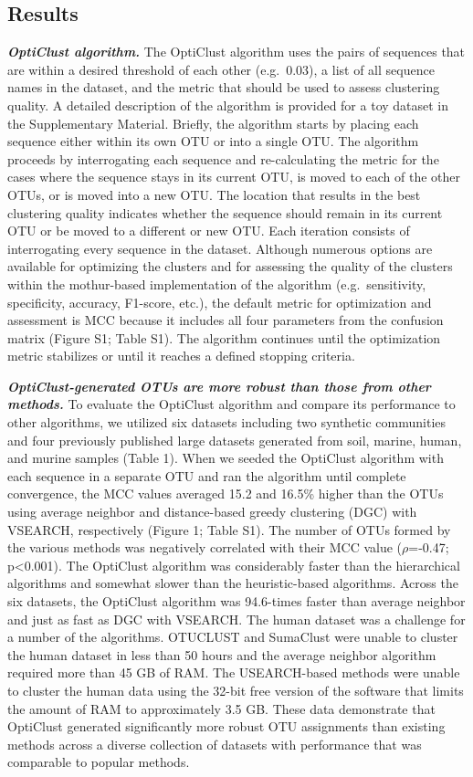 \documentclass[11pt,]{article}
\begin{document}
\subsection{Results}\label{results}

\textbf{\emph{OptiClust algorithm.}} The OptiClust algorithm uses the
pairs of sequences that are within a desired threshold of each other
(e.g.~0.03), a list of all sequence names in the dataset, and the metric
that should be used to assess clustering quality. A detailed description
of the algorithm is provided for a toy dataset in the Supplementary
Material. Briefly, the algorithm starts by placing each sequence either
within its own OTU or into a single OTU. The algorithm proceeds by
interrogating each sequence and re-calculating the metric for the cases
where the sequence stays in its current OTU, is moved to each of the
other OTUs, or is moved into a new OTU. The location that results in the
best clustering quality indicates whether the sequence should remain in
its current OTU or be moved to a different or new OTU. Each iteration
consists of interrogating every sequence in the dataset. Although
numerous options are available for optimizing the clusters and for
assessing the quality of the clusters within the mothur-based
implementation of the algorithm (e.g.~sensitivity, specificity,
accuracy, F1-score, etc.), the default metric for optimization and
assessment is MCC because it includes all four parameters from the
confusion matrix (Figure S1; Table S1). The algorithm continues until
the optimization metric stabilizes or until it reaches a defined
stopping criteria.

\textbf{\emph{OptiClust-generated OTUs are more robust than those from
other methods.}} To evaluate the OptiClust algorithm and compare its
performance to other algorithms, we utilized six datasets including two
synthetic communities and four previously published large datasets
generated from soil, marine, human, and murine samples (Table 1). When
we seeded the OptiClust algorithm with each sequence in a separate OTU
and ran the algorithm until complete convergence, the MCC values
averaged 15.2 and 16.5\% higher than the OTUs using average neighbor and
distance-based greedy clustering (DGC) with VSEARCH, respectively
(Figure 1; Table S1). The number of OTUs formed by the various methods
was negatively correlated with their MCC value (\(\rho\)=-0.47;
p\textless{}0.001). The OptiClust algorithm was considerably faster than
the hierarchical algorithms and somewhat slower than the heuristic-based
algorithms. Across the six datasets, the OptiClust algorithm was
94.6-times faster than average neighbor and just as fast as DGC with
VSEARCH. The human dataset was a challenge for a number of the
algorithms. OTUCLUST and SumaClust were unable to cluster the human
dataset in less than 50 hours and the average neighbor algorithm
required more than 45 GB of RAM. The USEARCH-based methods were unable
to cluster the human data using the 32-bit free version of the software
that limits the amount of RAM to approximately 3.5 GB. These data
demonstrate that OptiClust generated significantly more robust OTU
assignments than existing methods across a diverse collection of
datasets with performance that was comparable to popular methods.
\end{document}
